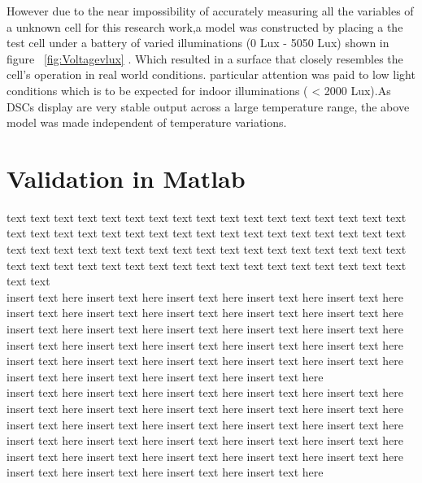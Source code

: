 However due to the near impossibility of accurately measuring all the variables of a unknown cell for this research work,a model was constructed by placing a the test cell under a battery of varied illuminations (0 Lux - 5050 Lux) shown in figure ~\ref{fig:Voltagevlux} . Which resulted in a surface that closely resembles the cell's operation in real world conditions. particular attention was paid to low light conditions which is to be expected for indoor illuminations ( < 2000 Lux).As \ac{DSCs} display are very stable output across a large temperature range, the above model was made independent of temperature variations. 


\section {Validation in Matlab{\textregistered}}

text text text text text text text text text text text text text text text text text text text text text text text text text text text text text text text text text text text text text text text text text text text text text text text text text text text text text text text text text text text text text text text text text text text text text text  \\



insert text here insert text here insert text here insert text here insert text here
insert text here insert text here insert text here insert text here insert text here insert text here insert text here insert text here insert text here insert text here insert text here insert text here insert text here insert text here insert text here insert text here insert text here insert text here insert text here insert text here insert text here insert text here insert text here insert text here   \\

insert text here insert text here insert text here insert text here insert text here
insert text here insert text here insert text here insert text here insert text here insert text here insert text here insert text here insert text here insert text here insert text here insert text here insert text here insert text here insert text here insert text here insert text here insert text here insert text here insert text here insert text here insert text here insert text here insert text here   \\




